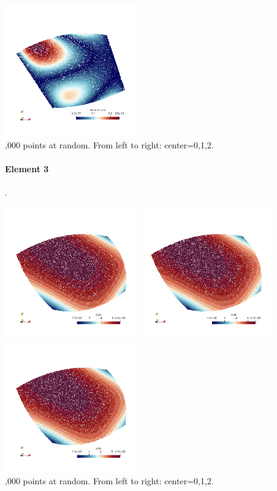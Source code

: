 \begin{center}
\includegraphics[width=5.7cm]{images/mappings/biquadratic3/elt2/error_posy2_2}\\
{,000 points at random. From left to right: center=0,1,2.} 
\end{center}




\paragraph{Element 3} .

\begin{center}
\includegraphics[width=5.7cm]{images/mappings/biquadratic3/elt3/jcob_0}
\includegraphics[width=5.7cm]{images/mappings/biquadratic3/elt3/jcob_1}
\includegraphics[width=5.7cm]{images/mappings/biquadratic3/elt3/jcob_2}\\
{,000 points at random. From left to right: center=0,1,2.} 
\end{center}




